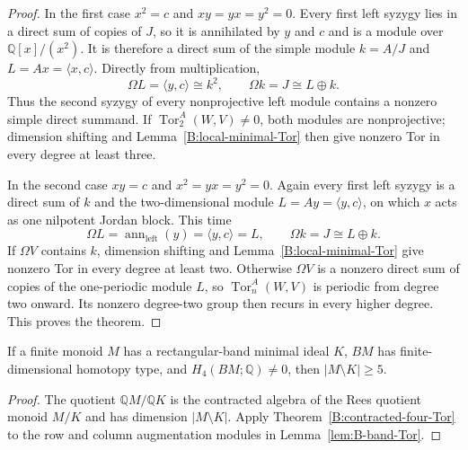 \begin{proof}
In the first case $x^2=c$ and $xy=yx=y^2=0$.
Every first left syzygy lies in a direct sum of copies of $J$,
so it is annihilated by $y$ and $c$ and is a module over
$\mathbb Q[x]/(x^2)$.  It is therefore a direct sum of the simple
module $k=A/J$ and $L=Ax=\langle x,c\rangle$.
Directly from multiplication,
\[
 \Omega L=\langle y,c\rangle\cong k^2,\qquad
 \Omega k=J\cong L\oplus k.
\]
Thus the second syzygy of every nonprojective left module contains
a nonzero simple direct summand.  If
$\operatorname{Tor}_2^A(W,V)\ne0$, both modules are
nonprojective; dimension shifting and
Lemma~\ref{B:local-minimal-Tor} then give nonzero Tor in every
degree at least three.

In the second case $xy=c$ and $x^2=yx=y^2=0$.
Again every first left syzygy is a direct sum of $k$ and the
two-dimensional module $L=Ay=\langle y,c\rangle$, on which
$x$ acts as one nilpotent Jordan block.  This time
\[
 \Omega L=\operatorname{ann}_{\mathrm{left}}(y)
          =\langle y,c\rangle=L,\qquad
 \Omega k=J\cong L\oplus k.
\]
If $\Omega V$ contains $k$, dimension shifting and
Lemma~\ref{B:local-minimal-Tor} give nonzero Tor in every degree
at least two.  Otherwise $\Omega V$ is a nonzero direct sum of
copies of the one-periodic module $L$, so
$\operatorname{Tor}_n^A(W,V)$ is periodic from degree two onward.
Its nonzero degree-two group then recurs in every higher degree.
This proves the theorem.
\end{proof}

\begin{corollary}\label{B:five-outside-minimal-band}
If a finite monoid $M$ has a rectangular-band minimal ideal $K$,
$BM$ has finite-dimensional homotopy type, and
$H_4(BM;\mathbb Q)\ne0$, then $|M\setminus K|\geq5$.
\end{corollary}

\begin{proof}
The quotient $\mathbb QM/\mathbb QK$ is the contracted algebra of
the Rees quotient monoid $M/K$ and has dimension
$|M\setminus K|$.  Apply Theorem~\ref{B:contracted-four-Tor}
to the row and column augmentation modules in
Lemma~\ref{lem:B-band-Tor}.
\end{proof}
